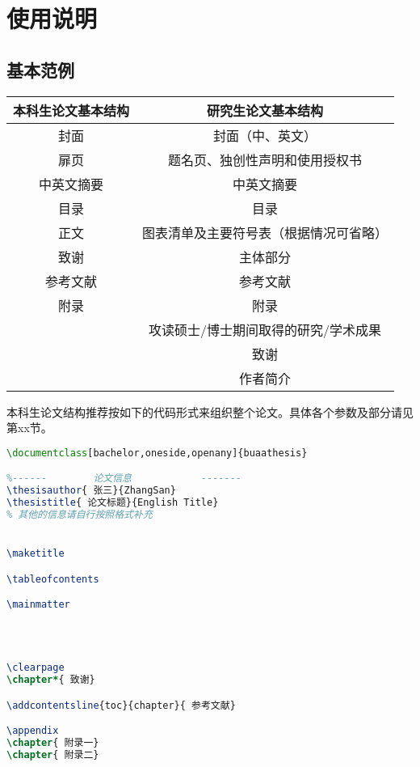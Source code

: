 \chapter{使用说明}
	\section{基本范例}
	\begin{center}
	\begin{table}[!ht]
		\begin{tabular}{|c|c|}
		\hline
		本科生论文基本结构 & 研究生论文基本结构\\\hline\hline
		封面 & 封面（中、英文）\\
		扉页 & 题名页、独创性声明和使用授权书\\
		中英文摘要 & 中英文摘要\\
		目录 & 目录\\
		正文 & 图表清单及主要符号表（根据情况可省略）\\
		致谢 & 主体部分\\
		参考文献 & 参考文献\\
		附录 & 附录\\
		~~ & 攻读硕士/博士期间取得的研究\slash 学术成果\\
		~~ & 致谢\\
		~~ & 作者简介\\
		\hline
		\end{tabular}
	\end{table}	
	\end{center}
\qquad 本科生论文结构推荐按如下的代码形式来组织整个论文。具体各个参数及部分请见第xx节。\par
\begin{lstlisting}[language={LaTeX}]
\documentclass[bachelor,oneside,openany]{buaathesis}

%------        论文信息            -------
\thesisauthor{ 张三}{ZhangSan}
\thesistitle{ 论文标题}{English Title}
% 其他的信息请自行按照格式补充


\maketitle

\tableofcontents

\mainmatter
	

	

\clearpage
\chapter*{ 致谢}

\addcontentsline{toc}{chapter}{ 参考文献}

\appendix
\chapter{ 附录一}
\chapter{ 附录二}


\end{lstlisting}
